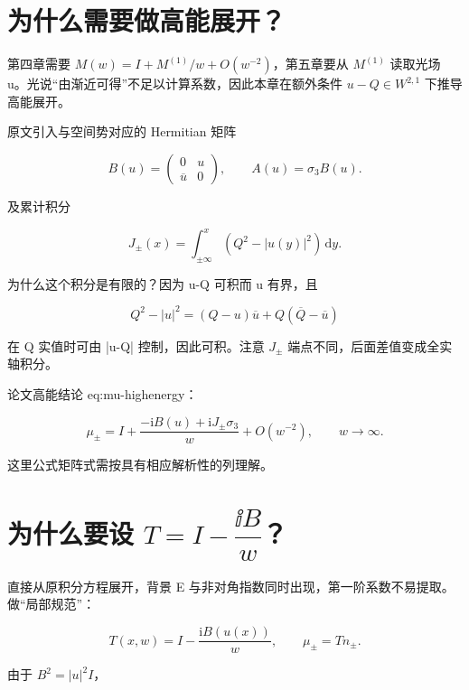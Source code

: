 \section{为什么需要做高能展开？}
\par

第四章需要 $M(w)=I+M^{(1)}/w+O(w^{-2})$，第五章要从 $M^{(1)}$ 读取光场 u。光说“由渐近可得”不足以计算系数，因此本章在额外条件 $u-Q\in{}W^{2,1}$ 下推导高能展开。\par

原文引入与空间势对应的 Hermitian 矩阵\par

\[
B(u)=\begin{pmatrix}0&u\\\overline u&0\end{pmatrix},
\qquad A(u)=\sigma_3B(u).
\]

及累计积分\par

\[
J_\pm(x)=\int_{\pm\infty}^{x}(Q^2-|u(y)|^2)\,\mathrm{d}y.
\]

为什么这个积分是有限的？因为 u-Q 可积而 u 有界，且\par

\[
Q^2-|u|^2
=(Q-u)\overline u+Q(\overline Q-\overline u)
\]

在 Q 实值时可由 |u-Q| 控制，因此可积。注意 $J_\pm{}$ 端点不同，后面差值变成全实轴积分。\par

论文高能结论 eq:mu-highenergy：\par

\[
\mu_\pm=I+\dfrac{-\mathrm{i}B(u)+\mathrm{i}J_\pm\sigma_3}{w}
+O(w^{-2}),
\qquad w\to\infty.
\]

这里公式矩阵式需按具有相应解析性的列理解。\par

\section{为什么要设 \texorpdfstring{$T=I-\dfrac{\ii B}{w}$}{T=I-iB/w}？}

直接从原积分方程展开，背景 E 与非对角指数同时出现，第一阶系数不易提取。做“局部规范”：\par

\[
T(x,w)=I-\dfrac{\mathrm{i}B(u(x))}{w},
\qquad \mu_\pm=Tn_\pm.
\]

由于 $B^{2}=|u|^{2}I$，\par

